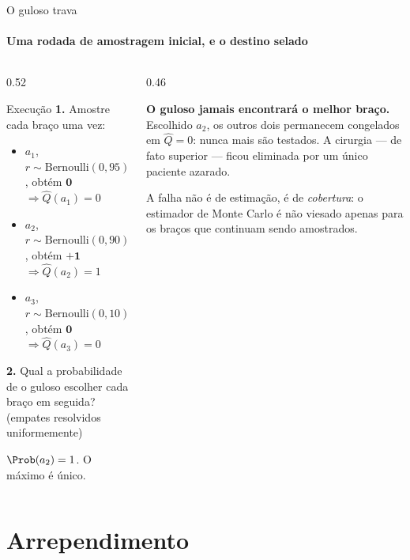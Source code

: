 \documentclass[aspectratio=169, 10pt]{beamer}
\newcommand{\Qhat}{\widehat{Q}}
\newcommand{\Ber}{\mathrm{Bernoulli}}
\begin{document}
\begin{frame}{O guloso trava}
  \framesubtitle{Uma rodada de amostragem inicial, e o destino selado}

  \begin{columns}[T]
    \begin{column}{0.52\textwidth}
      \begin{algbox}{Execução}
        \textbf{1.} Amostre cada braço uma vez:
        \begin{itemize}\setlength{\itemsep}{0.1ex}\small
          \item $a_1$, $r \sim \Ber(0{,}95)$, obtém $\mathbf{0}$
                $\Rightarrow \Qhat(a_1) = 0$
          \item $a_2$, $r \sim \Ber(0{,}90)$, obtém $\mathbf{+1}$
                $\Rightarrow \Qhat(a_2) = 1$
          \item $a_3$, $r \sim \Ber(0{,}10)$, obtém $\mathbf{0}$
                $\Rightarrow \Qhat(a_3) = 0$
        \end{itemize}
        \textbf{2.} Qual a probabilidade de o guloso escolher cada braço
        em seguida? (empates resolvidos uniformemente)
      \end{algbox}
      \pause
      \begin{respbox}
        $\Prob(a_2) = 1$. O máximo é único.
      \end{respbox}
    \end{column}
    \begin{column}{0.46\textwidth}
      \pause
      \begin{alertabox}
        \textbf{O guloso jamais encontrará o melhor braço.} Escolhido
        $a_2$, os outros dois permanecem congelados em $\Qhat = 0$: nunca
        mais são testados. A cirurgia --- de fato superior --- ficou
        eliminada por um único paciente azarado.
      \end{alertabox}
      \begin{ideiabox}
        A falha não é de estimação, é de \emph{cobertura}: o estimador de
        Monte Carlo é não viesado apenas para os braços que continuam
        sendo amostrados.
      \end{ideiabox}
    \end{column}
  \end{columns}
\end{frame}

\section{Arrependimento}
\end{document}
